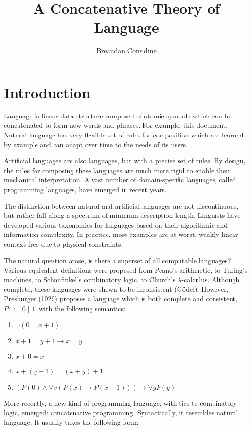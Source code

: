 \documentclass[11pt]{article}
\title{A Concatenative Theory of Language}
\author{Breandan Considine}
\begin{document}
\maketitle
\section{Introduction}

Language is linear data structure composed of atomic symbols which can be concatenated to form new words and phrases. For example, this document. Natural language has very flexible set of rules for composition which are learned by example and can adapt over time to the needs of its users.

Artificial languages are also languages, but with a precise set of rules. By design, the rules for composing these languages are much more rigid to enable their mechanical interpretation. A vast number of domain-specific languages, called programming languages, have emerged in recent years.

The distinction between natural and artificial languages are not discontinuous, but rather fall along a spectrum of minimum description length. Linguists have developed various taxonomies for languages based on their algorithmic and information complexity. In practice, most examples are at worst, weakly linear context free due to physical constraints.

The natural question arose, is there a superset of all computable languages? Various equivalent definitions were proposed from Peano's arithmetic, to Turing's machines, to Sch\"onfinkel's combinatory logic, to Church's $λ$-calculus. Although complete, these languages were shown to be inconsistent (G\"odel). However, Presburger (1929) proposes a language which is both complete and consistent, $P ::= 0 \mid 1$, with the following semantics:

\begin{enumerate}
   \item $¬(0 = x + 1)                 $
   \item $x + 1 = y + 1 → x = y        $
   \item $x + 0 = x                    $
   \item $x + (y + 1) = (x + y) + 1    $
   \item $(P(0) ∧ ∀x(P(x) → P(x + 1))) → ∀y P(y)$
\end{enumerate}

More recently, a new kind of programming language, with ties to combinatory logic, emerged: concatenative programming. Syntactically, it resembles natural language. It usually takes the following form:
\end{document}
